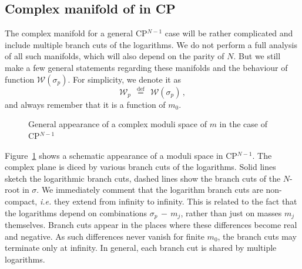 \documentclass[epsfig,12pt]{article}
\def\beq{\begin{equation}}
\def\eeq{\end{equation}}
\def\beq{\begin{equation}}
\def\eeq{\end{equation}}
\newcommand{\W}{\mathcal{W}}
\begin{document}
\subsection[Complex manifold of $ m $ in CP$^{N-1}$]
	{Complex manifold of  in CP}

	The  complex manifold for a general CP$^{N-1}$ case will be rather complicated and include
	multiple branch cuts of the logarithms.
	We do not perform a full analysis of all such manifolds, which will also depend on 
	the parity of $ N $.
	But we still make a few general statements regarding these manifolds and the behaviour of function $ \W(\sigma_p) $.
	For simplicity, we denote it as
\beq
	\W_p ~~\stackrel{\text{def}}{=} ~~ \W(\sigma_p)\,,
\eeq
	and always remember that it is a function of $ m_0 $.

\begin{figure}
\begin{center}
\epsfxsize=8.0cm
\caption{General appearance of a complex moduli space of $ m $ in the case of CP$^{N-1}$}
\label{fcpn}
\end{center}
\end{figure}
	Figure~\ref{fcpn} shows a schematic appearance of a moduli space in CP$^{N-1}$.
	The complex plane is diced by various branch cuts of the logarithms.
	Solid lines sketch the logarithmic branch cuts, dashed lines show the branch cuts of the $N$-root in $\sigma$.
	We immediately comment that the logarithm branch cuts are non-compact, 
	{\it i.e.} they extend from infinity to infinity.
	This is related to the fact that the logarithms depend on combinations $ \sigma_p \,-\, m_j $,
	rather than just on masses $ m_j $ themselves.
	Branch cuts appear in the places where these differences become real and negative.
	As such differences never vanish for finite $ m_0 $, the branch cuts may terminate only at infinity. 
	In general, each branch cut is shared by multiple logarithms.
\end{document}
